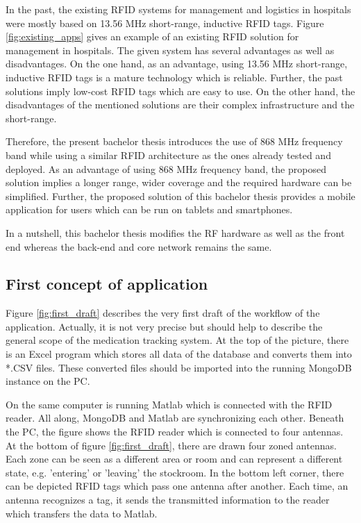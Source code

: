 In the past, the existing RFID systems for management and logistics in hospitals were mostly based on 13.56 MHz short-range, inductive RFID tags.
Figure \ref{fig:existing_apps} gives an example of an existing RFID solution for management in hospitals. The given system has several advantages as well as disadvantages. On the one hand, as an advantage, using 13.56 MHz short-range, inductive RFID tags is a mature technology which is reliable. Further, the past solutions imply low-cost RFID tags which are easy to use. 
On the other hand, the disadvantages of the mentioned solutions are their complex infrastructure and the short-range. 

Therefore, the present bachelor thesis introduces the use of 868 MHz frequency band while using a similar RFID architecture as the ones already tested and deployed. As an advantage of using 868 MHz frequency band, the proposed solution implies a longer range, wider coverage and the required hardware can be simplified. Further, the proposed solution of this bachelor thesis provides a mobile application for users which can be run on tablets and smartphones. 

In a nutshell, this bachelor thesis modifies the \ac{RF} hardware as well as the front end whereas the back-end and core network remains the same.

\subsection{First concept of application} \label{firstconcept}

Figure \ref{fig:first_draft} describes the very first draft of the workflow of the application. Actually, it is not very precise but should help to describe the general scope of the medication tracking system. 
At the top of the picture, there is an Excel program which stores all data of the database and converts them into *.CSV files. These converted files should be imported into the running MongoDB instance on the PC. 

On the same computer is running Matlab which is connected with the RFID reader. All along, MongoDB and Matlab are synchronizing each other. Beneath the PC, the figure shows the RFID reader which is connected to four antennas. At the bottom of figure \ref{fig:first_draft}, there are drawn four zoned antennas. Each zone can be seen as a different area or room and can represent a different state, e.g. 'entering' or 'leaving' the stockroom. In the bottom left corner, there can be depicted RFID tags which pass one antenna after another. Each time, an antenna recognizes a tag, it sends the transmitted information to the reader which transfers the data to Matlab.  

